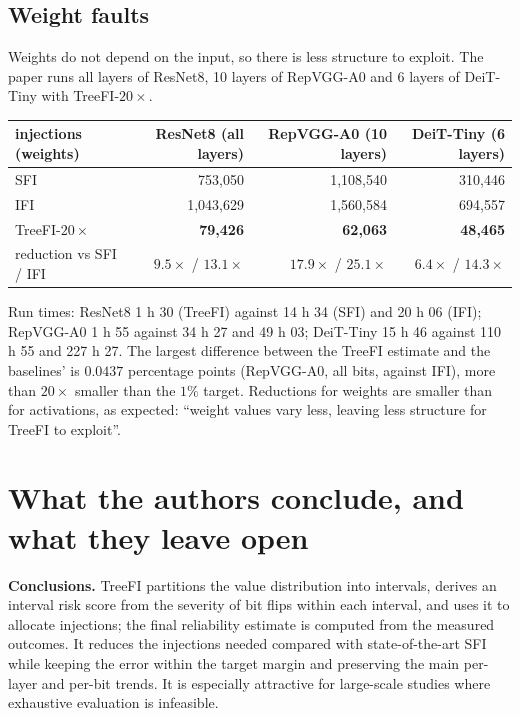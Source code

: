 \subsection{Weight faults}
Weights do not depend on the input, so there is less structure to exploit. The paper runs all layers of ResNet8, 10 layers of RepVGG-A0 and 6 layers of DeiT-Tiny with TreeFI-$20\times$.
\begin{center}
\small
\begin{tabular}{lrrr}
\toprule
injections (weights) & ResNet8 (all layers) & RepVGG-A0 (10 layers) & DeiT-Tiny (6 layers) \\
\midrule
SFI & 753{,}050 & 1{,}108{,}540 & 310{,}446 \\
IFI & 1{,}043{,}629 & 1{,}560{,}584 & 694{,}557 \\
TreeFI-$20\times$ & \textbf{79{,}426} & \textbf{62{,}063} & \textbf{48{,}465} \\
reduction vs SFI / IFI & $9.5\times$ / $13.1\times$ & $17.9\times$ / $25.1\times$ & $6.4\times$ / $14.3\times$ \\
\bottomrule
\end{tabular}
\end{center}
Run times: ResNet8 1 h 30 (TreeFI) against 14 h 34 (SFI) and 20 h 06 (IFI); RepVGG-A0 1 h 55 against 34 h 27 and 49 h 03; DeiT-Tiny 15 h 46 against 110 h 55 and 227 h 27. The largest difference between the TreeFI estimate and the baselines' is $0.0437$ percentage points (RepVGG-A0, all bits, against IFI),
more than $20\times$ smaller than the $1\%$ target. Reductions for weights are smaller than for activations, as expected: ``weight values vary less, leaving less structure for TreeFI to exploit''.

\section{What the authors conclude, and what they leave open}

\textbf{Conclusions.} TreeFI partitions the value distribution into intervals, derives an interval risk score from the severity of bit flips within each interval, and uses it to allocate injections; the final reliability estimate is computed from the measured outcomes. It reduces the injections needed
compared with state-of-the-art SFI while keeping the error within the target margin and preserving the main per-layer and per-bit trends. It is especially attractive for large-scale studies where exhaustive evaluation is infeasible.

